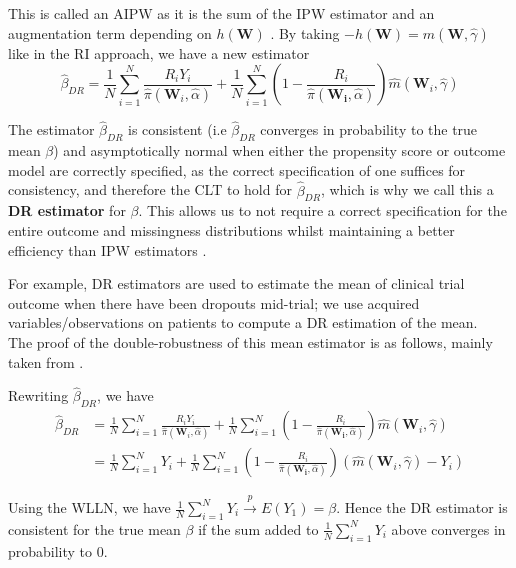 \documentclass[12pt,twoside]{article}
\begin{document}
This is called an AIPW as it is the sum of the IPW estimator and an augmentation term depending on $h(\mathbf{W})$ \citep{davidian}. By taking $-h(\mathbf{W}) = \hat m(\mathbf{W}, \hat{\gamma})$ like in the RI approach, we have a new estimator
\begin{equation}
    \hat\beta_{DR} = \frac{1}{N}\sum_{i=1}^{N}\frac{R_iY_i}{\hat \pi(\mathbf{W}_i, \hat{\alpha})} + \frac{1}{N}\sum_{i=1}^{N} \left(1 - \frac{R_i}{\hat\pi(\mathbf{W_i},\hat{\alpha})} \right) \hat m(\mathbf{W}_i, \hat\gamma)
\end{equation}

The estimator $\hat\beta_{DR}$ is consistent (i.e $\hat\beta_{DR}$ converges in probability to the true mean $\beta$) and asymptotically normal when either the propensity score or outcome model are correctly specified, as the correct specification of one suffices for consistency, and therefore the CLT to hold for $\hat\beta_{DR}$, which is why we call this a \textbf{DR estimator} for $\beta$. This allows us to not require a correct specification for the entire outcome and missingness distributions whilst maintaining a better efficiency than IPW estimators \citep{bangrobins,vansteelandt}.

For example, DR estimators are used to estimate the mean of clinical trial outcome when there have been dropouts mid-trial; we use acquired variables/observations on patients to compute a DR estimation of the mean. \\

The proof of the double-robustness of this mean estimator is as follows, mainly taken from \citet{vansteelandt}.

Rewriting $\hat{\beta}_{DR}$, we have
\begin{align*}
    \hat{\beta}_{DR} & = \frac{1}{N}\sum_{i=1}^{N}\frac{R_iY_i}{\hat\pi(\mathbf{W}_i, \hat{\alpha})} + \frac{1}{N}\sum_{i=1}^{N} \left(1 - \frac{R_i}{\hat\pi(\mathbf{W_i},\hat{\alpha})} \right) \hat m(\mathbf{W}_i, \hat\gamma) \\
    & = \frac{1}{N}\sum_{i=1}^{N} Y_i + \frac{1}{N}\sum_{i=1}^{N}\left(1 - \frac{R_i}{\hat\pi(\mathbf{W_i},\hat{\alpha})} \right) (\hat m(\mathbf{W}_i, \hat\gamma)-Y_i)
\end{align*}

Using the WLLN, we have $\frac{1}{N}\sum_{i=1}^{N} Y_i\xrightarrow{p} E(Y_1) = \beta$. Hence the DR estimator is consistent for the true mean $\beta$ if the sum added to $\frac{1}{N}\sum_{i=1}^{N} Y_i$ above converges in probability to 0. \\
\end{document}
